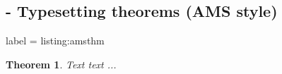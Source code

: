 
\subsection{ - Typesetting theorems (AMS style)}

\begin{tcblisting}{label = listing:amsthm}
  \theoremstyle{plain}
  \newtheorem{thm}{Theorem}[section]
  \begin{thm}
    Text text ...
  \end{thm}
\end{tcblisting}
